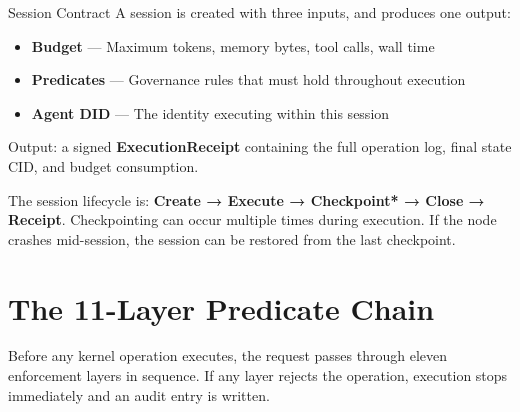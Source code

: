 \begin{conceptbox}{Session Contract}
A session is created with three inputs, and produces one output:
\begin{itemize}[noitemsep]
  \item \textbf{Budget} — Maximum tokens, memory bytes, tool calls, wall time
  \item \textbf{Predicates} — Governance rules that must hold throughout execution
  \item \textbf{Agent DID} — The identity executing within this session
\end{itemize}
Output: a signed \textbf{ExecutionReceipt} containing the full operation log,
final state CID, and budget consumption.
\end{conceptbox}

The session lifecycle is: \textbf{Create → Execute → Checkpoint* → Close → Receipt}.
Checkpointing can occur multiple times during execution. If the node crashes
mid-session, the session can be restored from the last checkpoint.

\section{The 11-Layer Predicate Chain}

Before any kernel operation executes, the request passes through eleven
enforcement layers in sequence. If any layer rejects the operation, execution
stops immediately and an audit entry is written.

